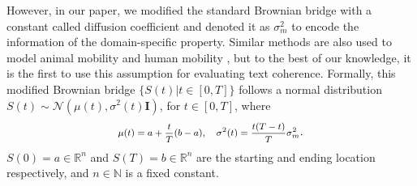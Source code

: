 \documentclass[letterpaper]{article} %
\begin{document}
However, in our paper, we modified the standard Brownian bridge with a constant called diffusion coefficient and denoted it as $\sigma_m^2$ to encode the information of the domain-specific property. Similar methods are also used to model animal mobility \citep{Horne:2007aa} and human mobility \citep{John:2021}, but to the best of our knowledge, it is the first to use this assumption for evaluating text coherence. Formally, this modified Brownian bridge $\{S(t)|t\in [0,T]\}$ follows a normal distribution $S(t)\sim \mathcal{N}(\mu(t),\sigma^2(t) \mathbf{I})$, for $t\in[0,T]$, where
\[
\footnotesize
\begin{aligned}
\mu(t) = a + \frac{t}{T} (b-a),\quad \sigma^2(t)= \frac{t(T-t)}{T} \sigma^2_m
\end{aligned}
.\]
$S(0)=a \in \mathbb{R}^n$ and $S(T)=b\in \mathbb{R}^n$ are the starting and ending location respectively, and $n\in \mathbb{N}$ is a fixed constant.
\end{document}
